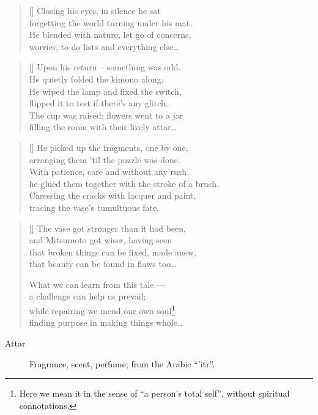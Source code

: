\begin{multicols}{2}
	\begin{verse}[\versewidth]
		Closing his eyes, in silence he sat\\
		forgetting the world turning under his mat.\\
		He blended with nature, let go of concerns,\\
		worries, to-do lists and everything else\ldots
	\end{verse}
	
	\begin{verse}[\versewidth]
		Upon his return -- something was odd.\\
		He quietly folded the kimono along.\\
		He wiped the lamp and fixed the switch,\\
		flipped it to test if there's any glitch.\\
		The cup was raised; flowers went to a jar\\
		filling the room with their lively attar\ldots
	\end{verse}
	
	
	\begin{verse}[\versewidth]
		He picked up the fragments, one by one,\\
		arranging them 'til the puzzle was done.\\
		With patience, care and without any rush\\
		he glued them together with the stroke of a brush.\\
		
		Caressing the cracks with lacquer and paint,\\
		tracing the vase's tumultuous fate.

	\end{verse}
	
	
	\begin{verse}[\versewidth]
		The vase got stronger than it had been,\\
		and Mitsumoto got wiser, having seen\\
		that broken things can be fixed, made anew,\\
		that beauty can be found in flaws too\ldots
		
		What we can learn from this tale ---\\
		a challenge can help us prevail;\\
		while repairing we mend our own soul\footnote{Here we mean it in the sense of ``a person's total self'', without spiritual connotations.}\\
		finding purpose in making things whole\ldots
	\end{verse}
	
	
\end{multicols}



\vspace{1cm}
\begin{description}
	\item[Attar] Fragrance, scent, perfume; from the Arabic ``'itr''.
\end{description}
